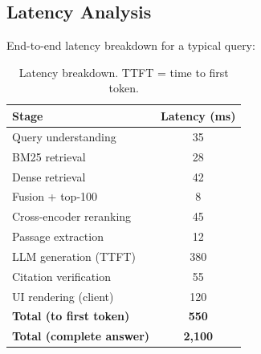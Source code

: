\subsection{Latency Analysis}

End-to-end latency breakdown for a typical query:

\begin{table}[H]
\centering
\begin{tabular}{lc}
\toprule
\textbf{Stage} & \textbf{Latency (ms)} \\
\midrule
Query understanding & 35 \\
BM25 retrieval & 28 \\
Dense retrieval & 42 \\
Fusion + top-100 & 8 \\
Cross-encoder reranking & 45 \\
Passage extraction & 12 \\
LLM generation (TTFT) & 380 \\
Citation verification & 55 \\
UI rendering (client) & 120 \\
\midrule
\textbf{Total (to first token)} & \textbf{550} \\
\textbf{Total (complete answer)} & \textbf{2,100} \\
\bottomrule
\end{tabular}
\caption{Latency breakdown. TTFT = time to first token.}
\label{tab:latency}
\end{table}

